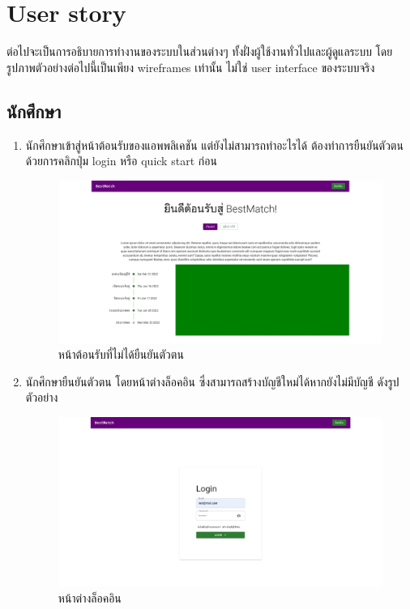 \section{User story}
ต่อไปจะเป็นการอธิบายการทำงานของระบบในส่วนต่างๆ ทั้งฝั่งผู้ใช้งานทั่วไปและผู้ดูแลระบบ โดยรูปภาพตัวอย่างต่อไปนี้เป็นเพียง wireframes เท่านั้น ไม่ใช่ user interface ของระบบจริง
\subsection{นักศึกษา}
\begin{enumerate}
  \item นักศึกษาเข้าสู่หน้าต้อนรับของแอพพลิเคชัน แต่ยังไม่สามารถทำอะไรได้ ต้องทำการยืนยันตัวตนด้วยการคลิกปุ่ม login หรือ quick start ก่อน
        \begin{figure}[ht]
          \begin{center}
            \includegraphics[width=\linewidth]{photo/web/student/home.jpeg}
          \end{center}
          \caption{หน้าต้อนรับที่ไม่ได้ยืนยันตัวตน}
          \label{fig:homepage}
        \end{figure}
        \clearpage
  \item นักศึกษายืนยันตัวตน โดยหน้าต่างล็อคอิน ซึ่งสามารถสร้างบัญชีใหม่ได้หากยังไม่มีบัญชี ดังรูปตัวอย่าง
        \begin{figure}[ht]
          \begin{center}
            \includegraphics[width=\linewidth]{photo/web/student/login.jpeg}
          \end{center}
          \caption{หน้าต่างล็อคอิน}
          \label{fig:login}
        \end{figure}
        

\end{enumerate}
